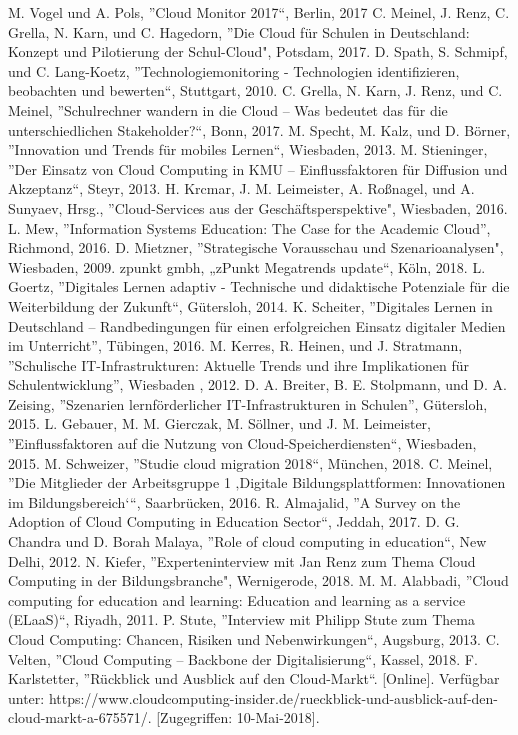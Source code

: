 \documentclass[conference]{IEEEtran}
\begin{document}
\begin{thebibliography}{00}
M. Vogel und A. Pols, ''Cloud Monitor 2017“, Berlin, 2017
 C. Meinel, J. Renz, C. Grella, N. Karn, und C. Hagedorn, ''Die Cloud für Schulen in Deutschland: Konzept und Pilotierung der Schul-Cloud", Potsdam, 2017.
D. Spath, S. Schmipf, und C. Lang-Koetz, ''Technologiemonitoring - Technologien identifizieren, beobachten und bewerten“, Stuttgart, 2010.
 C. Grella, N. Karn, J. Renz, und C. Meinel, ''Schulrechner wandern in die Cloud – Was bedeutet das für die unterschiedlichen Stakeholder?“, Bonn, 2017.
 M. Specht, M. Kalz, und D. Börner, ''Innovation und Trends für mobiles Lernen“, Wiesbaden, 2013.
 M. Stieninger, ''Der Einsatz von Cloud Computing in KMU – Einflussfaktoren für Diffusion und Akzeptanz“, Steyr, 2013.
 H. Krcmar, J. M. Leimeister, A. Roßnagel, und A. Sunyaev, Hrsg., ''Cloud-Services aus der Geschäftsperspektive", Wiesbaden, 2016.
 L. Mew, ''Information Systems Education: The Case for the Academic Cloud'', Richmond, 2016.
 D. Mietzner, ''Strategische Vorausschau und Szenarioanalysen", Wiesbaden, 2009.
zpunkt gmbh, „zPunkt Megatrends update“, Köln, 2018.
 L. Goertz, ''Digitales Lernen adaptiv - Technische und didaktische Potenziale für die Weiterbildung der Zukunft“, Gütersloh, 2014.
 K. Scheiter, ''Digitales Lernen in Deutschland – Randbedingungen für einen erfolgreichen Einsatz digitaler Medien im Unterricht'',  Tübingen, 2016.
 M. Kerres, R. Heinen, und J. Stratmann, ''Schulische IT-Infrastrukturen: Aktuelle Trends und ihre Implikationen für Schulentwicklung'',  Wiesbaden , 2012.
 D. A. Breiter, B. E. Stolpmann, und D. A. Zeising, ''Szenarien lernförderlicher IT-Infrastrukturen in Schulen'', Gütersloh, 2015.
 L. Gebauer, M. M. Gierczak, M. Söllner, und J. M. Leimeister, ''Einflussfaktoren auf die Nutzung von Cloud-Speicherdiensten“, Wiesbaden, 2015.
 M. Schweizer, ''Studie cloud migration 2018“, München, 2018.
 C. Meinel, ''Die Mitglieder der Arbeitsgruppe 1 ‚Digitale Bildungsplattformen: Innovationen im Bildungsbereich‘“, Saarbrücken, 2016.
 R. Almajalid, ''A Survey on the Adoption of Cloud Computing in Education Sector“, Jeddah, 2017.
 D. G. Chandra und D. Borah Malaya, ''Role of cloud computing in education“, New Delhi, 2012.
 N. Kiefer, ''Experteninterview mit Jan Renz zum Thema Cloud Computing in der Bildungsbranche", Wernigerode, 2018.
 M. M. Alabbadi, ''Cloud computing for education and learning: Education and learning as a service (ELaaS)“, Riyadh, 2011.
 P. Stute, ''Interview mit Philipp Stute zum Thema Cloud Computing: Chancen, Risiken und Nebenwirkungen“, Augsburg, 2013.
 C. Velten, ''Cloud Computing – Backbone der Digitalisierung“, Kassel, 2018.
 F. Karlstetter, ''Rückblick und Ausblick auf den Cloud-Markt“. [Online]. Verfügbar unter: https://www.cloudcomputing-insider.de/rueckblick-und-ausblick-auf-den-cloud-markt-a-675571/. [Zugegriffen: 10-Mai-2018].

\end{thebibliography}
\end{document}
